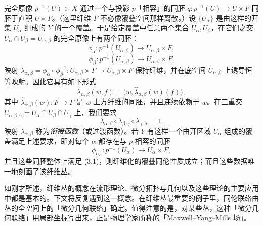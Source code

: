 完全原像 $p^{-1}(U)\subset X$ 通过一个与投影 $p$「相容」的同胚 $q:p^{-1}(U)\to U\times F$ 同胚于直积 $U\times F$。（这里纤维 $F$ 不必像覆叠空间那样离散。）设 $\{U_\alpha\}$ 是由这样的开集 $U_\alpha$ 组成的 $Y$ 的一个覆盖。于是给定覆盖中任意两个集合 $U_\alpha,U_\beta$，在它们之交 $U_\alpha\cap U_\beta=U_{\alpha,\beta}$ 的完全原像上有两个同胚：
\[
  \phi_\alpha:p^{-1}(U_{\alpha,\beta})\to U_{\alpha,\beta}\times F,
\]
\[
  \phi_\beta:p^{-1}(U_{\alpha,\beta})\to U_{\alpha,\beta}\times F.
\]
映射 $\lambda_{\alpha,\beta}=\phi_\alpha\circ\phi_\beta^{-1}:U_{\alpha,\beta}\times F\to U_{\alpha,\beta}\times F$ 保持纤维，并在底空间 $U_{\alpha,\beta}$ 上诱导恒等映射。因此它具有如下形式
\[
  \lambda_{\alpha,\beta}(w,f)=\bigl(w,\hat\lambda_{\alpha,\beta}(w)(f)\bigr),
\]
其中 $\hat\lambda_{\alpha,\beta}(w):F\to F$ 是 $w$ 上方纤维的同胚，并且连续依赖于 $w$。在三重交 $U_{\alpha,\beta,\gamma}=U_\alpha\cap U_\beta\cap U_\gamma$ 上，我们要求
\begin{equation}
  \lambda_{\alpha,\beta}\circ\lambda_{\beta,\gamma}\circ\lambda_{\gamma,\alpha}=1. \tag{3.1}
\end{equation}
映射 $\lambda_{\alpha,\beta}$ 称为\emph{衔接函数}（或过渡函数）。若 $Y$ 有这样一个由开区域 $U_\alpha$ 组成的覆盖满足上述要求，即对每个 $\alpha$ 都存在与 $p$ 相容的同胚
\[
  \phi_{U_\alpha}:p^{-1}(U_\alpha)\to U_\alpha\times F,
\]
并且这些同胚整体上满足 (3.1)，则纤维化的覆叠同伦性质成立；而且这些数据唯一地刻画了该纤维丛。

如刚才所述，纤维丛的概念在流形理论、微分拓扑与几何以及这些理论的主要应用中都是基本的。下文将反复遇到这一概念。在纤维丛最重要的例子里，同伦联络由丛的全空间上的「微分几何联络」确定。值得注意的是，对某些丛，这种「微分几何联络」用局部坐标写出来，正是物理学家所称的「Maxwell--Yang--Mills 场」。

